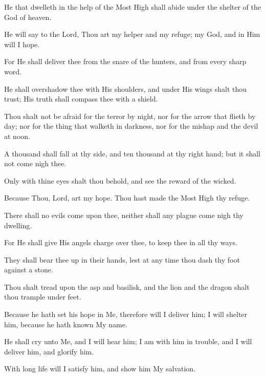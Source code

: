 He that dwelleth in the help of the Most High shall abide under the shelter of the God of heaven.

He will say to the Lord, Thou art my helper and my refuge; my God, and in Him will I hope.

For He shall deliver thee from the snare of the hunters, and from every sharp word.

He shall overshadow thee with His shoulders, and under His wings shalt thou trust; His truth shall compass thee with a shield.

Thou shalt not be afraid for the terror by night, nor for the arrow that flieth by day; nor for the thing that walketh in darkness, nor for the mishap and the devil at noon.

A thousand shall fall at thy side, and ten thousand at thy right hand; but it shall not come nigh thee.

Only with thine eyes shalt thou behold, and see the reward of the wicked.

Because Thou, Lord, art my hope. Thou hast made the Most High thy refuge.

There shall no evils come upon thee, neither shall any plague come nigh thy dwelling.

For He shall give His angels charge over thee, to keep thee in all thy ways.

They shall bear thee up in their hands, lest at any time thou dash thy foot against a stone.

Thou shalt tread upon the asp and basilisk, and the lion and the dragon shalt thou trample under feet.

Because he hath set his hope in Me, therefore will I deliver him; I will shelter him, because he hath known My name.

He shall cry unto Me, and I will hear him; I am with him in trouble, and I will deliver him, and glorify him.

With long life will I satisfy him, and show him My salvation.
